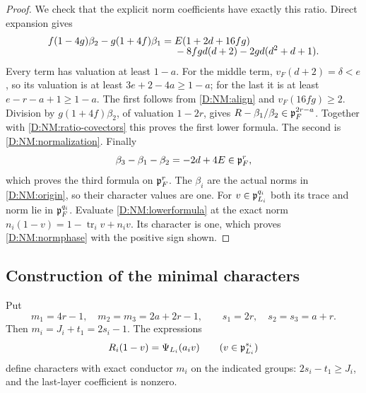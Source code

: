 \documentclass[11pt]{amsart}
\theoremstyle{definition}
\theoremstyle{remark}
\begin{document}
\begin{proof}
We check that the explicit norm coefficients have exactly this ratio.
Direct expansion gives
\begin{align}\label{D:NM:lower-error}
 f(1-4g)\beta_2-g(1+4f)\beta_1
 ={}&E(1+2d+16fg)\\[-6pt]
 &-8fgd(d+2)-2gd(d^2+d+1).\notag
\end{align}
Every term has valuation at least $1-a$. For the middle term,
$v_F(d+2)=\delta<e$, so its valuation is at least
$3e+2-4a\ge1-a$; for the last it is at least
$e-r-a+1\ge1-a$. The first follows from \eqref{D:NM:align} and
$v_F(16fg)\ge2$. Division by $g(1+4f)\beta_2$, of valuation $1-2r$,
gives $R-\beta_1/\beta_2\in\mathfrak p_F^{2r-a}$.
Together with \eqref{D:NM:ratio-covectors} this proves the first lower formula.
The second is \eqref{D:NM:normalization}. Finally
\[
 \beta_3-\beta_1-\beta_2=-2d+4E\in\mathfrak p_F^r,
\]
which proves the third formula on $\mathfrak p_F^r$.
The $\beta_i$ are the actual norms in \eqref{D:NM:origin}, so their character
values are one. For $v\in\mathfrak p_{L_i}^{q_i}$ both its trace and norm lie
in $\mathfrak p_F^{q_i}$. Evaluate \eqref{D:NM:lowerformula} at the exact norm
$n_i(1-v)=1-\operatorname{tr}_i v+n_i v$. Its character is one,
which proves \eqref{D:NM:normphase} with the positive sign shown.
\end{proof}

\subsection{Construction of the minimal characters}
Put
\begin{equation}\label{D:NM:cores}
 m_1=4r-1,\quad m_2=m_3=2a+2r-1,\qquad
 s_1=2r,\quad s_2=s_3=a+r.
\end{equation}
Then $m_i=J_i+t_1=2s_i-1$. The expressions
\begin{equation}\label{D:NM:Rcharts}
 R_i(1-v)=\Psi_{L_i}(a_i v)\qquad(v\in\mathfrak p_{L_i}^{s_i})
\end{equation}
define characters with exact conductor $m_i$ on the indicated groups:
$2s_i-t_1\ge J_i$, and the last-layer coefficient is nonzero.
\end{document}
